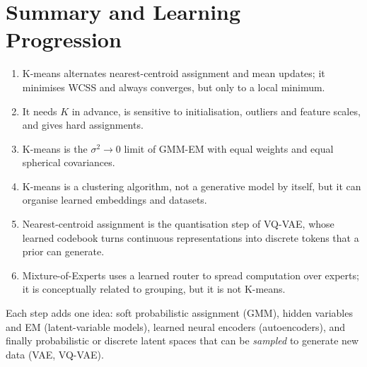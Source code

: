 \documentclass[11pt,a4paper]{article}
\begin{document}
\section{Summary and Learning Progression}

\begin{enumerate}[nosep]
\item K-means alternates nearest-centroid assignment and mean updates; it minimises WCSS and always converges, but only to a local minimum.
\item It needs $K$ in advance, is sensitive to initialisation, outliers and feature scales, and gives hard assignments.
\item K-means is the $\sigma^2\to0$ limit of GMM-EM with equal weights and equal spherical covariances.
\item K-means is a clustering algorithm, not a generative model by itself, but it can organise learned embeddings and datasets.
\item Nearest-centroid assignment is the quantisation step of VQ-VAE, whose learned codebook turns continuous representations into discrete tokens that a prior can generate.
\item Mixture-of-Experts uses a learned router to spread computation over experts; it is conceptually related to grouping, but it is not K-means.
\end{enumerate}

\begin{center}
\end{center}
Each step adds one idea: soft probabilistic assignment (GMM), hidden variables and EM (latent-variable models), learned neural encoders (autoencoders), and finally probabilistic or discrete latent spaces that can be \emph{sampled} to generate new data (VAE, VQ-VAE).
\end{document}
